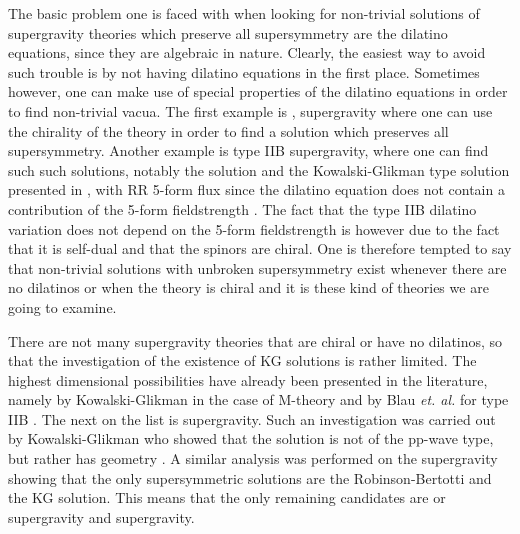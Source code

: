\documentclass[a4paper,12pt]{article}
\begin{document}
\par
The basic problem one is faced with when looking for non-trivial solutions of supergravity theories
which preserve all supersymmetry are the dilatino equations, since they are algebraic in
nature. Clearly, the easiest way to avoid such trouble is by not having dilatino equations
in the first place. Sometimes however, one can make use of special properties of the
dilatino equations in order to find non-trivial vacua. The first example is \coordHE{}, \coordHE{}
supergravity where one can use the chirality of the theory \cite{art:K_2} in order to
find a solution which preserves all supersymmetry. Another example is type IIB supergravity,
where one can find such such solutions, notably the \coordHE{} solution and the
Kowalski-Glikman type solution presented in \cite{art:blau}, with RR 5-form flux since the dilatino equation
does not contain a contribution of the 5-form fieldstrength \cite{art:S}. The fact that the type IIB dilatino
variation does not depend on the 5-form fieldstrength is however due to the fact that it is
self-dual and that the spinors are chiral.
One is therefore tempted to say that non-trivial solutions with unbroken supersymmetry exist
whenever there are no dilatinos or when the theory is chiral and it is these kind of theories
we are going to examine.
\par
There are not many supergravity theories that are chiral or have no dilatinos, so that the investigation
of the existence of KG solutions is rather limited. The highest dimensional possibilities have
already been presented in the literature, namely by Kowalski-Glikman in the case of M-theory \cite{art:K_1}
and by Blau {\em et. al.} for type IIB \cite{art:blau}. The next on the list is \coordHE{}  \coordHE{} supergravity. 
Such an investigation was carried out by Kowalski-Glikman \cite{art:K_2} who showed that the solution
is not of the pp-wave type, but rather has geometry \coordHE{}.
A similar analysis was performed on the \coordHE{}  \coordHE{} supergravity \cite{art:K_3} showing that the 
only supersymmetric solutions are the Robinson-Bertotti and the KG solution.
This means that the only remaining candidates are \coordHE{}  \coordHE{} or \coordHE{} supergravity and \coordHE{}  \coordHE{} supergravity. 
\end{document}
